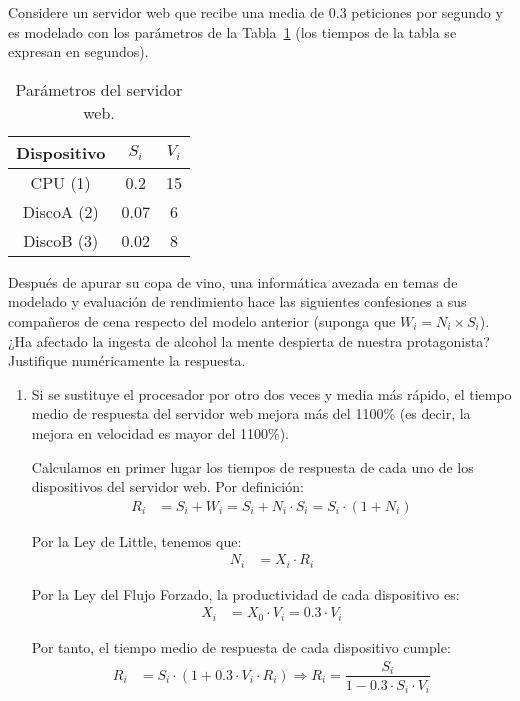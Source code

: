 \begin{ejercicio}\label{ej:5.20}
    Considere un servidor web que recibe una media de $0.3$ peticiones por segundo y es modelado con los parámetros de la Tabla~\ref{tab:5.20}
    (los tiempos de la tabla se expresan en segundos).
    \begin{table}[h]
        \centering
        \begin{tabular}{|c|c|c|}
            \hline
            Dispositivo & $S_i$ & $V_i$ \\
            \hline
            CPU (1) & 0.2 & 15 \\
            DiscoA (2) & 0.07 & 6 \\
            DiscoB (3) & 0.02 & 8 \\
            \hline
        \end{tabular}
        \caption{Parámetros del servidor web.}
        \label{tab:5.20}
    \end{table}
    Después de apurar su copa de vino, una informática avezada en temas de modelado y evaluación de rendimiento hace las siguientes confesiones a sus compañeros de cena respecto del modelo anterior (suponga que $W_i = N_i \times S_i$). ¿Ha afectado la ingesta de alcohol la mente despierta de nuestra protagonista? Justifique numéricamente la respuesta.
    \begin{enumerate}
        \item Si se sustituye el procesador por otro dos veces y media más rápido, el tiempo medio de respuesta del servidor web mejora más del 1100\% (es decir, la mejora en velocidad es mayor del 1100\%).
        
        Calculamos en primer lugar los tiempos de respuesta de cada uno de los dispositivos del servidor web. Por definición:
        \begin{align*}
            R_i &= S_i + W_i = S_i + N_i \cdot S_i = S_i \cdot (1 + N_i)
        \end{align*}

        Por la Ley de Little, tenemos que:
        \begin{align*}
            N_i &= X_i \cdot R_i
        \end{align*}

        Por la Ley del Flujo Forzado, la productividad de cada dispositivo es:
        \begin{align*}
            X_i &= X_0 \cdot V_i = 0.3 \cdot V_i
        \end{align*}

        Por tanto, el tiempo medio de respuesta de cada dispositivo cumple:
        \begin{align*}
            R_i &= S_i\cdot \left(1+ 0.3 \cdot V_i \cdot R_i\right)
            \Longrightarrow R_i = \dfrac{S_i}{1 - 0.3 \cdot S_i \cdot V_i}
        \end{align*}


\end{enumerate}
\end{ejercicio}
